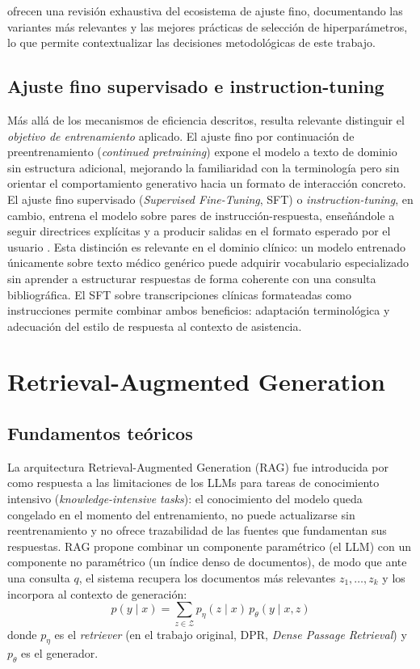 \documentclass[11pt,a4paper,spanish]{book}
\numberwithin{equation}{chapter}
\numberwithin{figure}{chapter}
\begin{document}
 ofrecen una revisión exhaustiva del ecosistema de ajuste fino, documentando las variantes más relevantes y las mejores prácticas de selección de hiperparámetros, lo que permite contextualizar las decisiones metodológicas de este trabajo.

\subsection{Ajuste fino supervisado e instruction-tuning}

Más allá de los mecanismos de eficiencia descritos, resulta relevante distinguir el \textit{objetivo de entrenamiento} aplicado. El ajuste fino por continuación de preentrenamiento (\textit{continued pretraining}) expone el modelo a texto de dominio sin estructura adicional, mejorando la familiaridad con la terminología pero sin orientar el comportamiento generativo hacia un formato de interacción concreto. El ajuste fino supervisado (\textit{Supervised Fine-Tuning}, SFT) o \textit{instruction-tuning}, en cambio, entrena el modelo sobre pares de instrucción-respuesta, enseñándole a seguir directrices explícitas y a producir salidas en el formato esperado por el usuario \cite{parthasarathy_ultimate_2024}. Esta distinción es relevante en el dominio clínico: un modelo entrenado únicamente sobre texto médico genérico puede adquirir vocabulario especializado sin aprender a estructurar respuestas de forma coherente con una consulta bibliográfica. El SFT sobre transcripciones clínicas formateadas como instrucciones permite combinar ambos beneficios: adaptación terminológica y adecuación del estilo de respuesta al contexto de asistencia.

\section{Retrieval-Augmented Generation}

\subsection{Fundamentos teóricos}

La arquitectura Retrieval-Augmented Generation (RAG) fue introducida por  como respuesta a las limitaciones de los LLMs para tareas de conocimiento intensivo (\textit{knowledge-intensive tasks}): el conocimiento del modelo queda congelado en el momento del entrenamiento, no puede actualizarse sin reentrenamiento y no ofrece trazabilidad de las fuentes que fundamentan sus respuestas. RAG propone combinar un componente paramétrico (el LLM) con un componente no paramétrico (un índice denso de documentos), de modo que ante una consulta $q$, el sistema recupera los documentos más relevantes $z_1, \ldots, z_k$ y los incorpora al contexto de generación:
\begin{equation}
  p(y \mid x) = \sum_{z \in \mathcal{Z}} p_\eta(z \mid x)\, p_\theta(y \mid x, z)
\end{equation}
donde $p_\eta$ es el \textit{retriever} (en el trabajo original, DPR, \textit{Dense Passage Retrieval}) y $p_\theta$ es el generador.
\end{document}
